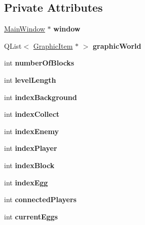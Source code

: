 \subsection*{Private Attributes}
\begin{DoxyCompactItemize}
\item 
\hypertarget{classGraphicLevel_af0e866c894dec93c0661631961922885}{
\hyperlink{classMainWindow}{MainWindow} $\ast$ {\bfseries window}}
\label{classGraphicLevel_af0e866c894dec93c0661631961922885}

\item 
\hypertarget{classGraphicLevel_a243af91dbaae226d179131dc0bf62df3}{
QList$<$ \hyperlink{classGraphicItem}{GraphicItem} $\ast$ $>$ {\bfseries graphicWorld}}
\label{classGraphicLevel_a243af91dbaae226d179131dc0bf62df3}

\item 
\hypertarget{classGraphicLevel_a4695b54ff0f0fe7e5ba79bef27e149a8}{
int {\bfseries numberOfBlocks}}
\label{classGraphicLevel_a4695b54ff0f0fe7e5ba79bef27e149a8}

\item 
\hypertarget{classGraphicLevel_af60543104fa2f887a9e6c8476780c349}{
int {\bfseries levelLength}}
\label{classGraphicLevel_af60543104fa2f887a9e6c8476780c349}

\item 
\hypertarget{classGraphicLevel_a7555c7687fa4a2e029f472b164bded8e}{
int {\bfseries indexBackground}}
\label{classGraphicLevel_a7555c7687fa4a2e029f472b164bded8e}

\item 
\hypertarget{classGraphicLevel_affde9c6ba7bcf4f20ee11a946746e802}{
int {\bfseries indexCollect}}
\label{classGraphicLevel_affde9c6ba7bcf4f20ee11a946746e802}

\item 
\hypertarget{classGraphicLevel_a8a4777d75aea9a6ecbafa669eefaa9ac}{
int {\bfseries indexEnemy}}
\label{classGraphicLevel_a8a4777d75aea9a6ecbafa669eefaa9ac}

\item 
\hypertarget{classGraphicLevel_a268ee810b9d2dadcbc04ae4b56e3427c}{
int {\bfseries indexPlayer}}
\label{classGraphicLevel_a268ee810b9d2dadcbc04ae4b56e3427c}

\item 
\hypertarget{classGraphicLevel_a3eb8ae4fa006931f5de8869300a9588e}{
int {\bfseries indexBlock}}
\label{classGraphicLevel_a3eb8ae4fa006931f5de8869300a9588e}

\item 
\hypertarget{classGraphicLevel_a947d5825dcf3ad776f0cec2495ea0621}{
int {\bfseries indexEgg}}
\label{classGraphicLevel_a947d5825dcf3ad776f0cec2495ea0621}

\item 
\hypertarget{classGraphicLevel_ade28284496fb8615f9b899ade7cff239}{
int {\bfseries connectedPlayers}}
\label{classGraphicLevel_ade28284496fb8615f9b899ade7cff239}

\item 
\hypertarget{classGraphicLevel_a7eeaaa951edb463f9603e7c21492ce66}{
int {\bfseries currentEggs}}
\label{classGraphicLevel_a7eeaaa951edb463f9603e7c21492ce66}

\end{DoxyCompactItemize}


